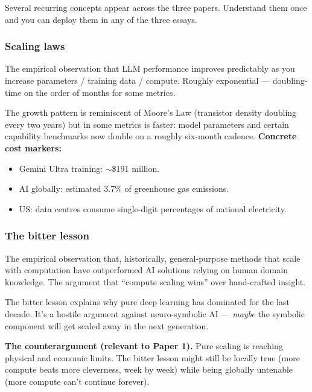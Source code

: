 \documentclass[11pt, a4paper]{article}
\begin{document}
Several recurring concepts appear across the three papers. Understand them once and you can deploy them in any of the three essays.

\subsubsection*{Scaling laws}

\begin{defbox}
The empirical observation that LLM performance improves predictably as you increase parameters / training data / compute. Roughly exponential — doubling-time on the order of months for some metrics.
\end{defbox}

The growth pattern is reminiscent of Moore's Law (transistor density doubling every two years) but in some metrics is faster: model parameters and certain capability benchmarks now double on a roughly six-month cadence. \textbf{Concrete cost markers:}
\begin{itemize}
  \item Gemini Ultra training: $\sim$\$191 million.
  \item AI globally: estimated 3.7\% of greenhouse gas emissions.
  \item US: data centres consume single-digit percentages of national electricity.
\end{itemize}

\subsubsection*{The bitter lesson}

\begin{defbox}
The empirical observation that, historically, general-purpose methods that scale with computation have outperformed AI solutions relying on human domain knowledge. The argument that ``compute scaling wins'' over hand-crafted insight.
\end{defbox}

The bitter lesson explains why pure deep learning has dominated for the last decade. It's a hostile argument against neuro-symbolic AI — \emph{maybe} the symbolic component will get scaled away in the next generation.

\textbf{The counterargument (relevant to Paper 1).} Pure scaling is reaching physical and economic limits. The bitter lesson might still be locally true (more compute beats more cleverness, week by week) while being globally untenable (more compute can't continue forever).
\end{document}
